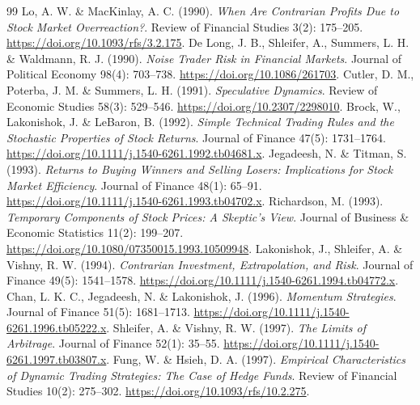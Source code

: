 \begin{thebibliography}{99}
 Lo, A. W. \& MacKinlay, A. C. (1990). \emph{When Are Contrarian Profits Due to Stock Market Overreaction?}. Review of Financial Studies 3(2): 175--205. \href{https://doi.org/10.1093/rfs/3.2.175}{https://doi.org/10.1093/rfs/3.2.175}.
 De Long, J. B., Shleifer, A., Summers, L. H. \& Waldmann, R. J. (1990). \emph{Noise Trader Risk in Financial Markets}. Journal of Political Economy 98(4): 703--738. \href{https://doi.org/10.1086/261703}{https://doi.org/10.1086/261703}.
 Cutler, D. M., Poterba, J. M. \& Summers, L. H. (1991). \emph{Speculative Dynamics}. Review of Economic Studies 58(3): 529--546. \href{https://doi.org/10.2307/2298010}{https://doi.org/10.2307/2298010}.
 Brock, W., Lakonishok, J. \& LeBaron, B. (1992). \emph{Simple Technical Trading Rules and the Stochastic Properties of Stock Returns}. Journal of Finance 47(5): 1731--1764. \href{https://doi.org/10.1111/j.1540-6261.1992.tb04681.x}{https://doi.org/10.1111/j.1540-6261.1992.tb04681.x}.
 Jegadeesh, N. \& Titman, S. (1993). \emph{Returns to Buying Winners and Selling Losers: Implications for Stock Market Efficiency}. Journal of Finance 48(1): 65--91. \href{https://doi.org/10.1111/j.1540-6261.1993.tb04702.x}{https://doi.org/10.1111/j.1540-6261.1993.tb04702.x}.
 Richardson, M. (1993). \emph{Temporary Components of Stock Prices: A Skeptic's View}. Journal of Business \& Economic Statistics 11(2): 199--207. \href{https://doi.org/10.1080/07350015.1993.10509948}{https://doi.org/10.1080/07350015.1993.10509948}.
 Lakonishok, J., Shleifer, A. \& Vishny, R. W. (1994). \emph{Contrarian Investment, Extrapolation, and Risk}. Journal of Finance 49(5): 1541--1578. \href{https://doi.org/10.1111/j.1540-6261.1994.tb04772.x}{https://doi.org/10.1111/j.1540-6261.1994.tb04772.x}.
 Chan, L. K. C., Jegadeesh, N. \& Lakonishok, J. (1996). \emph{Momentum Strategies}. Journal of Finance 51(5): 1681--1713. \href{https://doi.org/10.1111/j.1540-6261.1996.tb05222.x}{https://doi.org/10.1111/j.1540-6261.1996.tb05222.x}.
 Shleifer, A. \& Vishny, R. W. (1997). \emph{The Limits of Arbitrage}. Journal of Finance 52(1): 35--55. \href{https://doi.org/10.1111/j.1540-6261.1997.tb03807.x}{https://doi.org/10.1111/j.1540-6261.1997.tb03807.x}.
 Fung, W. \& Hsieh, D. A. (1997). \emph{Empirical Characteristics of Dynamic Trading Strategies: The Case of Hedge Funds}. Review of Financial Studies 10(2): 275--302. \href{https://doi.org/10.1093/rfs/10.2.275}{https://doi.org/10.1093/rfs/10.2.275}.

\end{thebibliography}
